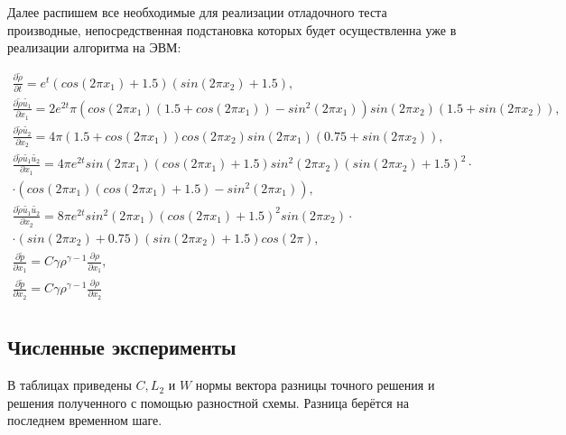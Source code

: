 Далее распишем все необходимые для реализации отладочного теста производные, непосредственная подстановка которых будет осуществленна уже в реализации алгоритма на ЭВМ:

\begin{equation}
	\begin{array}{lc}
		\frac{\partial\tilde{\rho}}{\partial t}  = e^t(cos(2\pi x_1) + 1.5)(sin(2\pi x_2) + 1.5), \\
		\frac{\partial\tilde{\rho}\tilde{u_1}}{\partial x_1}  = 2 e^{2 t} \pi (cos(2 \pi x_1) (1.5 + cos(2 \pi x_1)) - sin^2(2 \pi x_1)) sin(2 \pi x_2) (1.5 + sin(2 \pi x_2)), \\
		\frac{\partial\tilde{\rho}\tilde{u_2}}{\partial x_2}  = 4 \pi (1.5 + cos(2 \pi x_1)) cos(2 \pi x_2) sin(2 \pi x_1) (0.75 + sin(2 \pi x_2)), \\
		\frac{\partial \tilde{\rho} \tilde{u_1} \tilde{u_2}}{\partial x_1} = 4 \pi e^{2 t} sin(2 \pi x_1) (cos(2 \pi x_1) + 1.5) sin^2(2 \pi x_2) (sin(2 \pi x_2) + 1.5)^2 \cdot \\ \cdot (cos(2 \pi x_1) (cos(2 \pi x_1) + 1.5) - sin^2(2 \pi x_1)),\\
		\frac{\partial \tilde{\rho} \tilde{u_1} \tilde{u_2}}{\partial x_2} = 8 \pi e^{2 t} sin^2(2 \pi x_1) (cos(2 \pi x_1) + 1.5)^2 sin(2 \pi x_2) \cdot \\ \cdot (sin(2 \pi x_2) + 0.75) (sin(2 \pi x_2) + 1.5) cos(2 \pi ),\\
		\frac{\partial\tilde{p}}{\partial x_1} = C\gamma \rho^{\gamma - 1} \frac{\partial \rho}{\partial x_1}, \\		
		\frac{\partial\tilde{p}}{\partial x_2} = C\gamma \rho^{\gamma - 1} \frac{\partial \rho}{\partial x_2} \\
	\end{array}
\end{equation}
\fi

\newpage
\subsection {Численные эксперименты}
В таблицах приведены $C, L_2$ и $W$ нормы вектора разницы точного решения и решения полученного с помощью разностной схемы. Разница берётся на последнем временном шаге.


